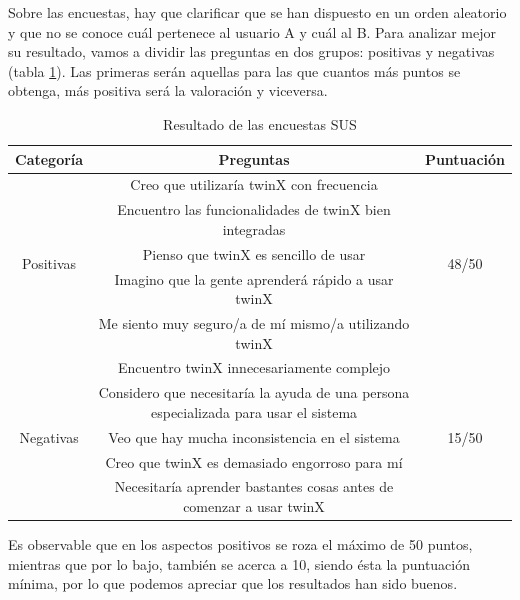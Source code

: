 Sobre las encuestas, hay que clarificar que se han dispuesto en un orden aleatorio y que no se conoce cuál pertenece al usuario A y cuál al B. Para analizar mejor su resultado, vamos a dividir las preguntas en dos grupos: positivas y negativas (tabla \ref{tab:resultadossus}). Las primeras serán aquellas para las que cuantos más puntos se obtenga, más positiva será la valoración y viceversa. 

\begin{table}[H]
	\begin{center}
		\begin{adjustbox}{width=\textwidth}
			\begin{tabular}{ | c | c | c | } 
				\hline
				\textbf{Categoría} & \textbf{Preguntas} & \textbf{Puntuación} \\
				\hline
				\multirow{5}{*}{Positivas} &
				Creo que utilizaría twinX con frecuencia  & \multirow{5}{*}{48/50} \\
				\cline{2-2}
				& Encuentro las funcionalidades de twinX bien integradas & \\
				\cline{2-2}
				& Pienso que twinX es sencillo de usar &  \\
				\cline{2-2}
				& Imagino que la gente aprenderá rápido a usar twinX & \\
				\cline{2-2}
				& Me siento muy seguro/a de mí mismo/a utilizando twinX &  \\
				\hline
				\multirow{5}{*}{Negativas}& Encuentro twinX innecesariamente complejo & \multirow{5}{*}{15/50} \\
				\cline{2-2}
				& Considero que necesitaría la ayuda de una persona especializada para usar el sistema & \\
				\cline{2-2}
				& Veo que hay mucha inconsistencia en el sistema & \\
				\cline{2-2}
				& Creo que twinX es demasiado engorroso para mí & \\
				\cline{2-2}
				& Necesitaría aprender bastantes cosas antes de comenzar a usar twinX &\\
				\hline
			\end{tabular}
		\end{adjustbox}
		\caption{Resultado de las encuestas SUS}
		\label{tab:resultadossus}
	\end{center}
\end{table}

Es observable que en los aspectos positivos se roza el máximo de 50 puntos, mientras que por lo bajo, también se acerca a 10, siendo ésta la puntuación mínima, por lo que podemos apreciar que los resultados han sido buenos.

